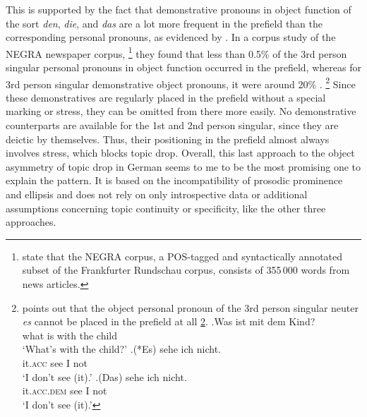 This is supported by the fact that demonstrative pronouns in object function of the sort \textit{den}, \textit{die}, and \textit{das} are a lot more frequent in the prefield  than the corresponding personal pronouns, as evidenced by \citet{bosch.etal2007}.
In a corpus study of the NEGRA newspaper corpus,%
\footnote{\citet[148, footnote 4]{bosch.etal2007} state that the NEGRA corpus, a POS-tagged and syntactically annotated subset of the Frankfurter Rundschau corpus, consists of 355\,000 words from news articles.}
%
 they found that less than 0.5\% of the 3rd person singular personal pronouns in object function occurred in the prefield, whereas for 3rd person singular demonstrative object pronouns, it were around 20\% \citep[149--150]{bosch.etal2007}.%
\footnote{\citet[116--117]{zifonun2001} points out that the object personal pronoun of the 3rd person singular neuter \textit{es} cannot be placed in the prefield at all \ref{ex:td.obj.demonstratives.es}. %
\exg.\label{ex:td.obj.demonstratives.es}Was ist mit dem Kind?\\
what is with the child\\
`What's with the child?'
\ag.\label{ex:td.obj.pers.3SG.es}(*Es) sehe ich nicht.\\
\phantom{(*}it.\textsc{acc} see I not\\
`I don't see (it).' 
\bg.\label{ex:td.obj.dem.3SG.es}(Das) sehe ich nicht.\\
it.\textsc{acc.dem} see I not\\
`I don't see (it).'\par \vspace{-1\baselineskip}
}
Since these demonstratives are regularly placed in the prefield without a special marking or stress, they can be omitted from there more easily.
No demonstrative counterparts are available for the 1st and 2nd person singular, since they are deictic by themselves.
Thus, their positioning in the prefield almost always involves stress, which blocks topic drop.
Overall, this last approach to the object asymmetry of topic drop in German seems to me to be the most promising one to explain the pattern.
It is based on the incompatibility of prosodic prominence  and ellipsis and does not rely on only introspective data or additional assumptions concerning topic continuity or specificity, like the other three approaches.
 
    
